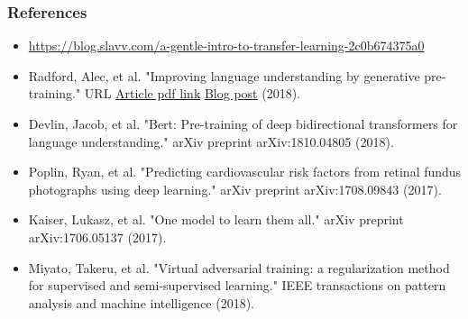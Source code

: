 \documentclass[10pt]{beamer}
\begin{document}
\begin{frame}
  \frametitle{References}

  \fontsize{6pt}{7.2}\selectfont

  \begin{itemize}
  \item \href{https://blog.slavv.com/a-gentle-intro-to-transfer-learning-2c0b674375a0}{https://blog.slavv.com/a-gentle-intro-to-transfer-learning-2c0b674375a0}
  \item Radford, Alec, et al. "Improving language understanding by generative pre-training." URL
    \href{https://s3-us-west-2.amazonaws.com/openai-assets/research-covers/language-unsupervised/language_understanding_paper.pdf}{Article pdf link}
    \href{https://blog.openai.com/language-unsupervised/}{Blog post} (2018).
  \item Devlin, Jacob, et al. "Bert: Pre-training of deep
    bidirectional transformers for language understanding." arXiv
    preprint arXiv:1810.04805 (2018).
  \item Poplin, Ryan, et al. "Predicting cardiovascular risk factors
    from retinal fundus photographs using deep learning."  arXiv
    preprint arXiv:1708.09843 (2017).
  \item Kaiser, Lukasz, et al. "One model to learn them all."  arXiv
    preprint arXiv:1706.05137 (2017).
  \item Miyato, Takeru, et al. "Virtual adversarial training: a
    regularization method for supervised and semi-supervised
    learning." IEEE transactions on pattern analysis and machine
    intelligence (2018).
  \end{itemize}
\end{frame}
\end{document}
